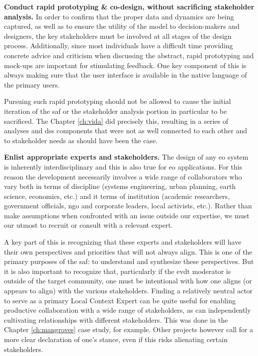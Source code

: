 \textbf{Conduct rapid prototyping \& co-design, without sacrificing stakeholder analysis.} In order to confirm that the proper data and dynamics are being captured, as well as to ensure the utility of the model to decision-makers and designers, the key stakeholders must be involved at all stages of the design process. Additionally, since most individuals have a difficult time providing concrete advice and criticism when discussing the abstract, rapid prototyping and mock-ups are important for stimulating feedback. One key component of this is always making sure that the user interface is available in the native language of the primary users.

Pursuing such rapid prototyping should not be allowed to cause the initial iteration of the \ac{saf} or the stakeholder analysis portion in particular to be sacrificed. The Chapter \ref{ch:vida} did precisely this, resulting in a series of analyses and \ac{dss} components that were not as well connected to each other and to stakeholder needs as should have been the case.

\textbf{Enlist appropriate experts and stakeholders.} The design of any \ac{eo} system is inherently interdisciplinary and this is also true for \ac{eo} applications. For this reason the development necessarily involves a wide range of collaborators who vary both in terms of discipline (systems engineering, urban planning, earth science, economics, etc.) and it terms of institution (academic researchers, government officials, \ac{ngo} and corporate leaders, local activists, etc.). Rather than make assumptions when confronted with an issue outside our expertise, we must our utmost to recruit or consult with a relevant expert. 

A key part of this is recognizing that these experts and stakeholders will have their own perspectives and priorities that will not always align. This is one of the primary purposes of the \ac{saf}: to understand and synthesize these perspectives. But it is also important to recognize that, particularly if the \ac{evdt} moderator is outside of the target community, one must be intentional with how one aligns (or appears to align) with the various stakeholders. Finding a relatively neutral actor to serve as a primary Local Context Expert can be quite useful for enabling productive collaboration with a wide range of stakeholders, as can independently cultivating relationships with different stakeholders. This was done in the Chapter \ref{ch:mangroves} case study, for example. Other projects however call for a more clear declaration of one's stance, even if this risks alienating certain stakeholders.

